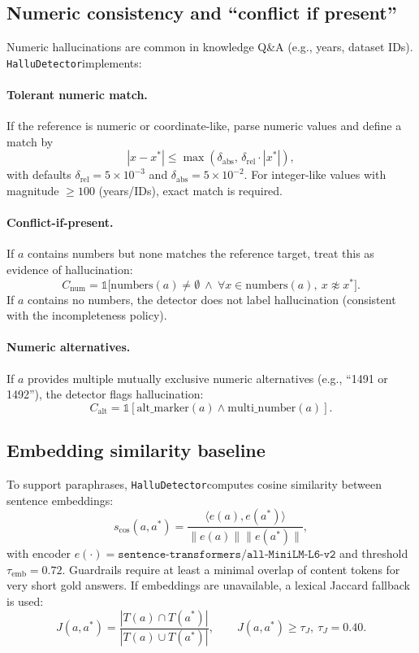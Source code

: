 \documentclass[11pt]{article}
\newcommand{\dataset}{\texttt{HalluDetector}}
\begin{document}
\subsection{Numeric consistency and ``conflict if present''}
Numeric hallucinations are common in knowledge Q\&A (e.g., years, dataset IDs). \dataset implements:

\paragraph{Tolerant numeric match.}
If the reference is numeric or coordinate-like, parse numeric values and define a match by
\begin{equation}
|x - x^*| \le \max(\delta_{\text{abs}},\, \delta_{\text{rel}}\cdot |x^*|),
\end{equation}
with defaults \(\delta_{\text{rel}}=5\times10^{-3}\) and \(\delta_{\text{abs}}=5\times10^{-2}\).
For integer-like values with magnitude \(\ge 100\) (years/IDs), exact match is required.

\paragraph{Conflict-if-present.}
If \(a\) contains numbers but none matches the reference target, treat this as evidence of hallucination:
\begin{equation}
C_{\text{num}} = \mathbb{1}\big[\text{numbers}(a)\neq\emptyset \ \wedge\ \forall x\in\text{numbers}(a),\ x\not\approx x^*\big].
\end{equation}
If \(a\) contains no numbers, the detector does not label hallucination (consistent with the incompleteness policy).

\paragraph{Numeric alternatives.}
If \(a\) provides multiple mutually exclusive numeric alternatives (e.g., ``1491 or 1492''), the detector flags hallucination:
\begin{equation}
C_{\text{alt}} = \mathbb{1}[\text{alt\_marker}(a)\wedge \text{multi\_number}(a)].
\end{equation}

\subsection{Embedding similarity baseline}
To support paraphrases, \dataset computes cosine similarity between sentence embeddings:
\begin{equation}
s_{\cos}(a,a^*) = \frac{\langle e(a), e(a^*)\rangle}{\|e(a)\|\|e(a^*)\|},
\end{equation}
with encoder \(e(\cdot)=\texttt{sentence-transformers/all-MiniLM-L6-v2}\) \cite{reimers2019sbert} and threshold \(\tau_{\text{emb}}=0.72\). Guardrails require at least a minimal overlap of content tokens for very short gold answers. If embeddings are unavailable, a lexical Jaccard fallback is used:
\begin{equation}
J(a,a^*) = \frac{|T(a)\cap T(a^*)|}{|T(a)\cup T(a^*)|},\qquad J(a,a^*)\ge\tau_J,\ \tau_J=0.40.
\end{equation}
\end{document}
